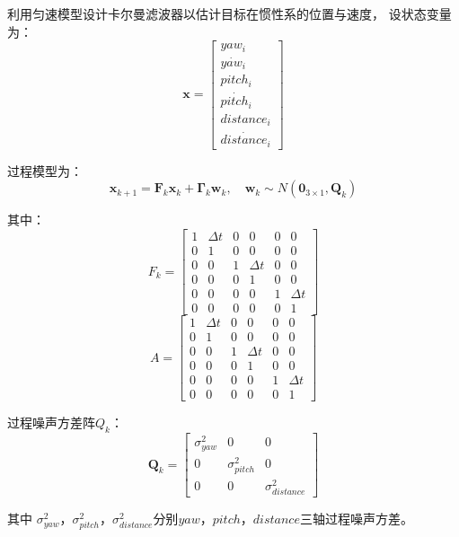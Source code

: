 利用匀速模型设计卡尔曼滤波器以估计目标在惯性系的位置与速度，
设状态变量为：\begin{equation} \boldsymbol x =\left[\begin{array}{c} yaw_i\\ \dot {yaw_i}\\ pitch_i\\ \dot {pitch_i} \\ distance_i\\ \dot {distance_i} \end{array}\right] \end{equation}
\par
过程模型为：\begin{equation} \boldsymbol  x_{k+1} = \boldsymbol F_k\boldsymbol  x_k + \boldsymbol{\Gamma}_{k}\boldsymbol {w}_{k}, \quad \boldsymbol {w}_{k} \sim N\left(\boldsymbol 0_{3 \times 1}, \boldsymbol Q_k \right) \end{equation}

其中： 
\begin{equation} F_k =\left[\begin{array}{cccccc} 1 &  \Delta t & 0 &0&0&0\\ 0 &  1 & 0 &0&0&0\\ 0 & 0 & 1&  \Delta t & 0 &0\\ 0&0&   0&1 &0 &0\\ 0 &0& 0 &0& 1 &\Delta t \\ 0 &0& 0 & 0 &0 &1 \end{array}\right] \end{equation}
\begin{equation} A =\left[\begin{array}{cccccc} 1 &  \Delta t & 0 &0&0&0\\ 0 &  1 & 0 &0&0&0\\ 0 & 0 & 1&  \Delta t & 0 &0\\ 0&0&   0&1 &0 &0\\ 0 &0& 0 &0& 1 &\Delta t \\ 0 &0& 0 & 0 &0 &1 \end{array}\right] \end{equation}

过程噪声方差阵$Q_k$：
\begin{equation} \boldsymbol Q_k =\left[\begin{array}{ccc} \sigma_{yaw}^2 &  0 & 0 \\ 0 &  \sigma_{pitch}^2 & 0 \\ 0 & 0 & \sigma_{distance}^2 \end{array}\right] \end{equation}
\par
其中 $\sigma_{yaw}^2$，$\sigma_{pitch}^2$，$\sigma_{distance}^2$分别$yaw$，$pitch$，$distance$三轴过程噪声方差。
\par


